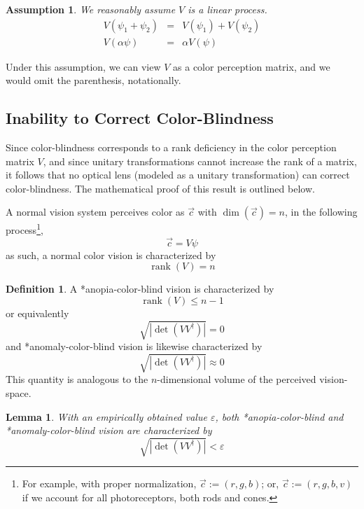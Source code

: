 \documentclass[10pt,a4paper]{article}
\newtheorem{lem}{Lemma}[section]
\newtheorem{ass}{Assumption}[section]
\theoremstyle{definition}
\newtheorem{defn}{Definition}[section]
\theoremstyle{remark}
\numberwithin{equation}{section}
\DeclareMathOperator{\rank}{rank}
\newcommand{\abs}[1]{\left\vert#1\right\vert}
\newcommand{\eps}{\varepsilon}
\newcommand{\pdet}[1]{            \sqrt{\abs{   \det    \left(#1 #1^\dagger \right)   }}               }
\begin{document}
\begin{ass}
We reasonably assume $V$ is a linear process.
\begin{eqnarray}
V(\psi_1+\psi_2)&=&V(\psi_1)+V(\psi_2)\\
V(\alpha \psi)&=&\alpha V(\psi)
\end{eqnarray}
\end{ass}
Under this assumption, we can view $V$ as a color perception matrix, and we would omit the parenthesis, notationally.


\subsection{Inability to Correct Color-Blindness}
Since color-blindness corresponds to a rank deficiency in the color perception matrix $V$, and since unitary transformations cannot increase the rank of a matrix, it follows that no optical lens (modeled as a unitary transformation) can correct color-blindness. The mathematical proof of this result is outlined below.

A normal vision system perceives color as $\vec{c}$ with $\dim(\vec{c})=n$, in the following process\footnote{For example, with proper normalization, $\vec{c}:= (r,g,b)$; or, $\vec{c}:= (r,g,b,v)$ if we account for all photoreceptors, both rods and cones.}, 
\begin{equation}
\vec{c} = V \psi 
\end{equation}
as such, a normal color vision is characterized by 
\begin{equation}
\rank(V)=n
\end{equation}


\begin{defn}
A *anopia-color-blind vision is characterized by 
\begin{equation}
\rank(V)\leq n-1
\end{equation}
or equivalently
\begin{equation}
\pdet{V}= 0
\end{equation}
and *anomaly-color-blind vision is likewise characterized by 
\begin{equation}
\pdet{V}\approx 0
\end{equation}
This quantity is analogous to the  $n$-dimensional volume of the perceived vision-space.
\end{defn}

\begin{lem}
With an empirically obtained value $\eps$, both *anopia-color-blind and *anomaly-color-blind vision are characterized by 
\begin{equation}
\pdet{V} < \eps
\end{equation}
\end{lem}
\end{document}
